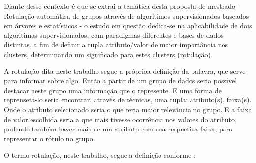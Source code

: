 Diante desse contexto é que se extrai a temática desta proposta de mestrado - Rotulação automática de grupos através de algoritimos supervisionados baseados em árvores e estatísticos - o estudo em questão dedica-se na aplicabilidade de dois algoritimos supervisionados, com paradigmas diferentes e bases de dados distintas, a fim de  definir a tupla atributo/valor de maior importância nos clusters, determinando um significado para estes clusters (rotulação).

A rotulação dita neste trabalho segue a próprioa definição da palavra, que serve para informar sobre algo. Então a partir de um grupo de dados seria possível destacar neste grupo uma informação que o represente. E uma forma de reprensetá-lo seria encontrar, através de técnicas, uma tupla: atributo(s), faixa(s). Onde o atributo selecionado seria o que teria maior relevância no grupo. E a faixa de valor escolhida seria a que mais tivesse ocorrência nos valores do atributo, podendo também haver mais de um atributo com sua respectiva faixa, para representar o rótulo no grupo.  


O termo rotulação, neste trabalho, segue a definição conforme : 

